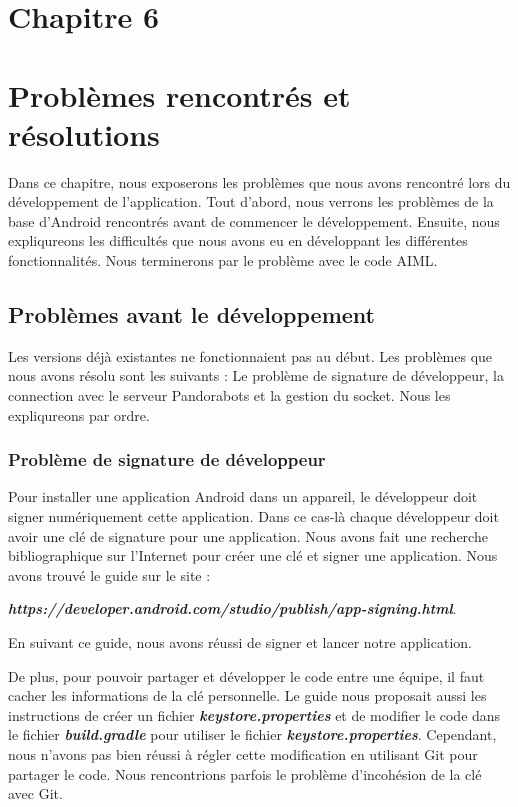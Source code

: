\section*{Chapitre 6}
\section{Problèmes rencontrés et résolutions}

\indent Dans ce chapitre, nous exposerons les problèmes que nous avons rencontré lors du développement de l'application. Tout d'abord, nous verrons les problèmes de la base d'Android rencontrés avant de commencer le développement. Ensuite, nous expliqureons les difficultés que nous avons eu en développant les différentes fonctionnalités. Nous terminerons par le problème avec le code AIML.

\subsection{Problèmes avant le développement}

\indent Les versions déjà existantes ne fonctionnaient pas au début. Les problèmes que nous avons résolu sont les suivants : Le problème de signature de développeur, la connection avec le serveur Pandorabots et la gestion du socket. Nous les expliqureons par ordre.

\subsubsection{Problème de signature de développeur}

\indent Pour installer une application Android dans un appareil, le développeur doit signer numériquement cette application. Dans ce cas-là chaque développeur doit avoir une clé de signature pour une application. Nous avons fait une recherche bibliographique sur l'Internet pour créer une clé et signer une application. Nous avons trouvé le guide sur le site : 
\begin{center}
\textbf{\emph{https://developer.android.com/studio/publish/app-signing.html}}.\\
\end{center}
En suivant ce guide, nous avons réussi de signer et lancer notre application.

\indent De plus, pour pouvoir partager et développer le code entre une équipe, il faut cacher les informations de la clé personnelle. Le guide nous proposait aussi les instructions de créer un fichier \textbf{\emph{keystore.properties}} et de modifier le code dans le fichier \textbf{\emph{build.gradle}} pour utiliser le fichier \textbf{\emph{keystore.properties}}. Cependant, nous n'avons pas bien réussi à régler cette modification en utilisant Git pour partager le code. Nous rencontrions parfois le problème d'incohésion de la clé avec Git.

